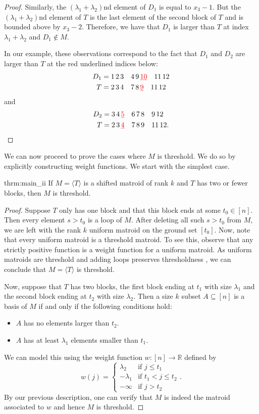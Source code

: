 \documentclass[10pt,a4paper]{amsart}
\makeatletter
\let\laneX@cite\cite
\renewcommand{\cite}{\protect\laneX@citenew}
\newcommand{\laneX@citenew}{\@ifnextchar[{\laneX@cite@a}{\laneX@cite@b}}
\def\laneX@cite@b#1{\laneX@cite{#1}}
\def\laneX@cite@a[#1]{\@ifnextchar[{\laneX@cite@c{#1}}{\laneX@cite@d{#1}}}
\def\laneX@cite@d#1#2{\laneX@cite[#1]{#2}}
\def\laneX@cite@c#1[#2]#3{[\unskip #1 \csname b@#3\endcsname, #2]}
\theoremstyle{definition}
\theoremstyle{plain}
\newcommand{\R}{\mathbb{R}}
\makeatother
\begin{document}
\begin{proof}
Similarly, the $(\lambda_1+\lambda_2)$nd element of $D_1$ is equal to $x_3-1$. But the $(\lambda_1+\lambda_2)$nd element of $T$ is the last element of the second block of $T$ and is bounded above by $x_3-2$. Therefore, we have that $D_1$ is larger than $T$ at index $\lambda_1+\lambda_2$ and $D_1\not\in M$.

In our example, these observations correspond to the fact that $D_1$ and $D_2$ are larger than $T$ at the red underlined indices below:
\begin{align*}
D_1 = 1\, 2\, 3\quad  4\, 9\, &{\color{red}\underline{10}}\quad  11\,12\\
T=2\,3\,4\quad 7\,8\,&{\color{red} \underline 9}\quad 11\,12
\end{align*}
and 
\begin{align*}
D_2 = 3\, 4\, &{\color{red} \underline 5}\quad 6\, 7\,  8\quad 9\, 12\\
T=2\,3\,&{\color{red} \underline 4}\quad 7\,8\,9\quad 11\,12.
\end{align*}
\end{proof}

We can now proceed to prove the cases where $M$ is threshold. We do so by explicitly constructing weight functions. We start with the simplest case.
\begin{reptheorem}{thrm:main_ii}
If $M=\langle T\rangle$ is a shifted matroid of rank $k$ and $T$ has two or fewer blocks, then $M$ is threshold.
\end{reptheorem}
\begin{proof}
Suppose $T$ only has one block and that this block ends at some $t_0\in [n]$. Then every element $s>t_0$ is a loop of $M$. After deleting all such $s>t_0$ from $M$, we are left with the rank $k$ uniform matroid on the ground set $[t_0]$. Now, note that every uniform matroid is a threshold matroid. To see this, observe that any strictly positive function is a weight function for a uniform matroid. As uniform matroids are threshold and adding loops preserves thresholdness \cite[Lemma $5.2$]{DO}, we can conclude that $M=\langle T \rangle$ is threshold.

Now, suppose that $T$ has two blocks, the first block ending at $t_1$ with size $\lambda_1$ and the second block ending at $t_2$ with size $\lambda_2$. Then a size $k$ subset $A\subseteq [n]$ is a basis of $M$ if and only if the following conditions hold:
\begin{itemize}
\item $A$ has no elements larger than $t_2$.
\item $A$ has at least $\lambda_1$ elements smaller than $t_1$.
\end{itemize}
We can model this using the weight function $w:[n]\to \R$ defined by
\[w(j) = \begin{cases}
 \lambda_2 & \text{if $j\leq t_1$}\\
 -\lambda_1 & \text{if $t_1< j \leq t_2$}\\
 -\infty & \text{if $j> t_2$}
\end{cases}. \]
By our previous description, one can verify that $M$ is indeed the matroid associated to $w$ and hence $M$ is threshold.
\end{proof}
\end{document}
